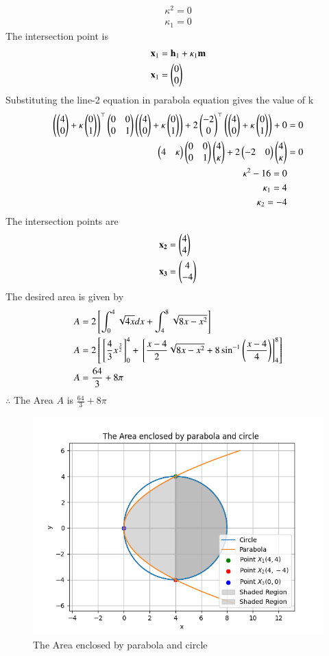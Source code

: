 \documentclass[journal]{IEEEtran}
\begin{document}
\begin{align}
    \kappa^2 = 0 \\
    \kappa_1 = 0
\end{align}
The intersection point is 
\begin{align}
    \mathbf{x}_1 &= \mathbf{h}_1 + \kappa_1\mathbf{m}\\
    \mathbf{x}_1 &= \begin{pmatrix}0 \\ 0\end{pmatrix}
\end{align}
Substituting the line-2 equation in parabola equation gives the value of k
\begin{align}
    \left(\begin{pmatrix}4\\0\end{pmatrix}+\kappa\begin{pmatrix}0\\1\end{pmatrix}\right)^\top\begin{pmatrix}0 & 0\\0 & 1\end{pmatrix}\left(\begin{pmatrix}4\\0\end{pmatrix}+\kappa\begin{pmatrix}0\\1\end{pmatrix}\right) + 2\begin{pmatrix}-2\\0\end{pmatrix}^\top\left(\begin{pmatrix}4\\0\end{pmatrix}+\kappa\begin{pmatrix}0\\1\end{pmatrix}\right) + 0 &= 0\\
\begin{pmatrix}4&\kappa\end{pmatrix}\begin{pmatrix}0&0\\0&1\end{pmatrix}\begin{pmatrix}4\\\kappa\end{pmatrix}+2\begin{pmatrix}-2&0\end{pmatrix}\begin{pmatrix}4\\\kappa\end{pmatrix} &= 0\\
\kappa^2 - 16 = 0 \\
\kappa_1 = 4 \\
\kappa_2 = -4
\end{align}
The intersection points are 
\begin{align}
\mathbf{x_2} &= \begin{pmatrix}4\\4\end{pmatrix}\\
\mathbf{x_3} &= \begin{pmatrix}4\\-4\end{pmatrix}
\end{align}
The desired area is given by 
\begin{align}
    A &= 2{}\left[\int_{0}^{4}\sqrt{4x}dx + \int_{4}^{8}\sqrt{8x - x^2} \right] \\
    A &= 2{}\left[{}\left[\frac{4}{3} x^{\frac{3}{2}}\right]_{0}^{4} + {}\left[\frac{x-4}{2}\sqrt{8x - x^2} + 8 \sin^{-1}\left(\frac{x-4}{4}\right)\right]_4^8 \right]\\
     A &= \frac{64}{3}+ 8 \pi
\end{align}
$\therefore$ The Area $A$ is $\frac{64}{3} + 8\pi$
\begin{figure}[h!]
   \centering
   \includegraphics[width = 1\linewidth]{figs/fig.png}
   \caption{The Area enclosed by parabola and circle}
   \label{stemplot}
   \end{figure}
\end{document}
